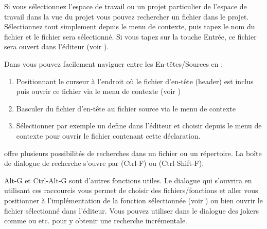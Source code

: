 Si vous sélectionnez l'espace de travail ou un projet particulier de l'espace de travail dans la vue du projet vous pouvez rechercher un fichier dans le projet. Sélectionnez tout simplement  depuis le menu de contexte, puis tapez le nom du fichier et le fichier sera sélectionné. Si vous tapez sur la touche Entrée, ce fichier sera ouvert dans l'éditeur (voir ).


Dans \codeblocks vous pouvez facilement naviguer entre les En-têtes/Sources en :

\begin{enumerate}
\item Positionnant le curseur à l'endroit où le fichier d'en-tête (header) est inclus puis ouvrir ce fichier via le menu de contexte  (voir )
\item Basculer du fichier d'en-tête au fichier source via le menu de contexte 
\item Sélectionner par exemple un define dans l'éditeur et choisir  depuis le menu de contexte pour ouvrir le fichier contenant cette déclaration.
\end{enumerate}


\codeblocks offre plusieurs possibilités de recherches dans un fichier ou un répertoire. La boîte de dialogue de recherche s'ouvre par  (Ctrl-F) ou  (Ctrl-Shift-F).

Alt-G et Ctrl-Alt-G sont d'autres fonctions utiles. Le dialogue qui s'ouvrira en utilisant ces raccourcis vous permet de choisir des fichiers/fonctions et aller vous positionner à l'implémentation de la fonction sélectionnée (voir ) ou bien ouvrir le fichier sélectionné dans l'éditeur. Vous pouvez utiliser dans le dialogue des jokers comme \codeline{*} ou  etc. pour y obtenir une recherche incrémentale.



